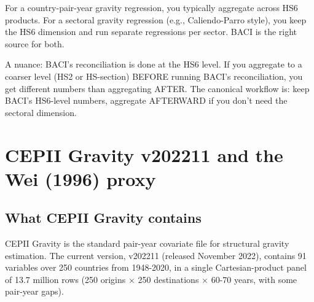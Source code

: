 \documentclass[11pt,letterpaper,oneside]{book}
\theoremstyle{definition}
\theoremstyle{remark}
\begin{document}
For a country-pair-year gravity regression, you typically aggregate
across HS6 products. For a sectoral gravity regression (e.g.,
Caliendo-Parro style), you keep the HS6 dimension and run separate
regressions per sector. BACI is the right source for both.

A nuance: BACI's reconciliation is done at the HS6 level. If you
aggregate to a coarser level (HS2 or HS-section) BEFORE running BACI's
reconciliation, you get different numbers than aggregating AFTER. The
canonical workflow is: keep BACI's HS6-level numbers, aggregate
AFTERWARD if you don't need the sectoral dimension.

\chapter{CEPII Gravity v202211 and the Wei (1996) proxy}
\label{ch:cepii}

\section{What CEPII Gravity contains}

CEPII Gravity is the standard pair-year covariate file for structural
gravity estimation. The current version, v202211 (released November
2022), contains 91 variables over 250 countries from 1948-2020, in a
single Cartesian-product panel of 13.7 million rows (250 origins $\times$
250 destinations $\times$ 60-70 years, with some pair-year gaps).
\end{document}

